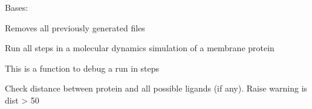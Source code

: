 \documentclass[letterpaper,10pt,english]{sphinxmanual}
\begin{document}
\begin{fulllineitems}
\label{\detokenize{run:run.Run}}
\pysigstartsignatures
{}
\pysigstopsignatures
\sphinxAtStartPar
Bases: 

\begin{fulllineitems}
\label{\detokenize{run:run.Run.clean}}
\pysigstartsignatures
{}
\pysigstopsignatures
\sphinxAtStartPar
Removes all previously generated files

\end{fulllineitems}


\begin{fulllineitems}
\label{\detokenize{run:run.Run.moldyn}}
\pysigstartsignatures
{}
\pysigstopsignatures
\sphinxAtStartPar
Run all steps in a molecular dynamics simulation of a membrane protein

\end{fulllineitems}


\begin{fulllineitems}
\label{\detokenize{run:run.Run.light_moldyn}}
\pysigstartsignatures
{}
\pysigstopsignatures
\sphinxAtStartPar
This is a function to debug a run in steps

\end{fulllineitems}


\begin{fulllineitems}
\label{\detokenize{run:run.Run.check_dist}}
\pysigstartsignatures
{}
\pysigstopsignatures
\sphinxAtStartPar
Check distance between protein and all possible ligands (if any).
Raise warning is dist \textgreater{} 50

\end{fulllineitems}


\end{fulllineitems}
\end{document}
